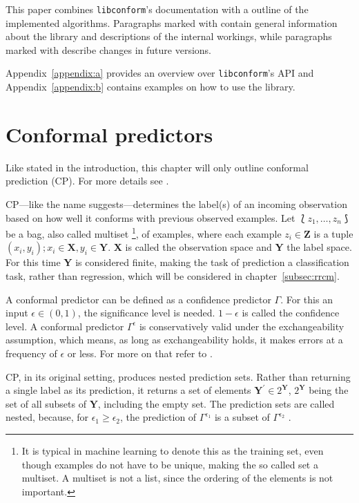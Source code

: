 \documentclass[twoside,11pt]{article}
\def\libconform{\texttt{libconform}}
\def\info{\textcolor{blue}{\faInfo}}
\def\alert{\textcolor{red}{\faExclamation}}
\begin{document}
This paper combines \libconform{}'s documentation with a
outline of the implemented algorithms.
Paragraphs marked with \info{} contain general information
about the library and descriptions of the
internal workings, while paragraphs marked
with \alert{} describe changes in future versions.

Appendix~\ref{appendix:a} provides an overview over
\libconform's API and Appendix~\ref{appendix:b} contains
examples on how to use the library.


\section{Conformal predictors}

Like stated in the introduction, this chapter will only
outline conformal prediction (CP). For more details see
\citet{alrw}.

CP---like the name suggests---determines the label(s) of an
incoming observation based on how well it conforms with
previous observed examples.
Let $\Lbag z_1,\dots,z_n \Rbag$ be a bag, also called
multiset%
\footnote{It is typical in machine learning to denote this
as the training set, even though examples do not have to
be unique, making the so called set a multiset. A multiset
is not a list, since the ordering of the elements is not
important.},
of examples, where each example $z_i \in \textbf{Z}$ is a
tuple $(x_i,y_i); x_i \in \textbf{X}, y_i \in \textbf{Y}$.
\textbf{X} is called the observation space and \textbf{Y}
the label space. For this time \textbf{Y} is considered
finite, making the task of prediction a classification
task, rather than regression, which will be considered in
chapter~\ref{subsec:rrcm}.

A conformal predictor can be defined as a confidence
predictor $\Gamma$. For this an input $\epsilon \in (0,1)$,
the significance level is needed. $1 - \epsilon$ is called
the confidence level. A conformal predictor
$\Gamma^\epsilon$ is conservatively valid under the
exchangeability assumption, which means, as long as
exchangeability holds, it makes errors at
a frequency of $\epsilon$ or less. For more on that refer
to \citet[][chapters 1,2,7]{alrw}.

CP, in its original setting, produces nested prediction
sets. Rather than returning a single label as its
prediction, it returns a set of elements
$\textbf{Y}^\prime \in 2^{\textbf{Y}}$, $2^{\textbf{Y}}$
being the set of all subsets of $\textbf{Y}$, including the
empty set.
The prediction sets are called nested, because, for
$\epsilon_1 \geq \epsilon_2$, the prediction of
$\Gamma^{\epsilon_1}$ is a subset of $\Gamma^{\epsilon_2}$
\citep[see][chapter 2]{alrw}.
\end{document}
